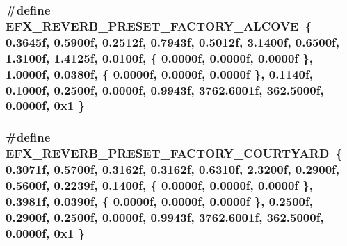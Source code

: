 \subsubsection[{\texorpdfstring{E\+F\+X\+\_\+\+R\+E\+V\+E\+R\+B\+\_\+\+P\+R\+E\+S\+E\+T\+\_\+\+F\+A\+C\+T\+O\+R\+Y\+\_\+\+A\+L\+C\+O\+VE}{EFX_REVERB_PRESET_FACTORY_ALCOVE}}]{\setlength{\rightskip}{0pt plus 5cm}\#define E\+F\+X\+\_\+\+R\+E\+V\+E\+R\+B\+\_\+\+P\+R\+E\+S\+E\+T\+\_\+\+F\+A\+C\+T\+O\+R\+Y\+\_\+\+A\+L\+C\+O\+VE~\{ 0.\+3645f, 0.\+5900f, 0.\+2512f, 0.\+7943f, 0.\+5012f, 3.\+1400f, 0.\+6500f, 1.\+3100f, 1.\+4125f, 0.\+0100f, \{ 0.\+0000f, 0.\+0000f, 0.\+0000f \}, 1.\+0000f, 0.\+0380f, \{ 0.\+0000f, 0.\+0000f, 0.\+0000f \}, 0.\+1140f, 0.\+1000f, 0.\+2500f, 0.\+0000f, 0.\+9943f, 3762.\+6001f, 362.\+5000f, 0.\+0000f, 0x1 \}}\hypertarget{efx-presets_8h_a20efe3830ae7142d45be73af807e4d04}{}\label{efx-presets_8h_a20efe3830ae7142d45be73af807e4d04}
\subsubsection[{\texorpdfstring{E\+F\+X\+\_\+\+R\+E\+V\+E\+R\+B\+\_\+\+P\+R\+E\+S\+E\+T\+\_\+\+F\+A\+C\+T\+O\+R\+Y\+\_\+\+C\+O\+U\+R\+T\+Y\+A\+RD}{EFX_REVERB_PRESET_FACTORY_COURTYARD}}]{\setlength{\rightskip}{0pt plus 5cm}\#define E\+F\+X\+\_\+\+R\+E\+V\+E\+R\+B\+\_\+\+P\+R\+E\+S\+E\+T\+\_\+\+F\+A\+C\+T\+O\+R\+Y\+\_\+\+C\+O\+U\+R\+T\+Y\+A\+RD~\{ 0.\+3071f, 0.\+5700f, 0.\+3162f, 0.\+3162f, 0.\+6310f, 2.\+3200f, 0.\+2900f, 0.\+5600f, 0.\+2239f, 0.\+1400f, \{ 0.\+0000f, 0.\+0000f, 0.\+0000f \}, 0.\+3981f, 0.\+0390f, \{ 0.\+0000f, 0.\+0000f, 0.\+0000f \}, 0.\+2500f, 0.\+2900f, 0.\+2500f, 0.\+0000f, 0.\+9943f, 3762.\+6001f, 362.\+5000f, 0.\+0000f, 0x1 \}}\hypertarget{efx-presets_8h_a687a7fe2f8084947684e61917343ac38}{}\label{efx-presets_8h_a687a7fe2f8084947684e61917343ac38}
